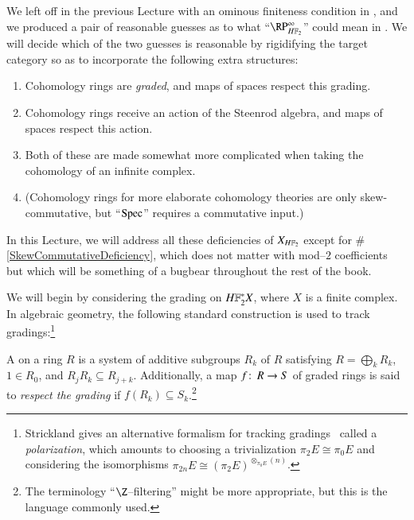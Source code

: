 We left off in the previous Lecture with an ominous finiteness condition in , and we produced a pair of reasonable guesses as to what ``$\RP^\infty_{\HFtwo}$'' could mean in .  We will decide which of the two guesses is reasonable by rigidifying the target category so as to incorporate the following extra structures:
\begin{enumerate}
\item Cohomology rings are \emph{graded}, and maps of spaces respect this grading.
\item Cohomology rings receive an action of the Steenrod algebra, and maps of spaces respect this action.
\item Both of these are made somewhat more complicated when taking the cohomology of an infinite complex.
\item \label{SkewCommutativeDeficiency} (Cohomology rings for more elaborate cohomology theories are only skew-commutative, but ``$\operatorname{Spec}$'' requires a commutative input.)
\end{enumerate}
In this Lecture, we will address all these deficiencies of $X_{\HFtwo}$ except for \#\ref{SkewCommutativeDeficiency}, which does not matter with mod--$2$ coefficients but which will be something of a bugbear throughout the rest of the book.

We will begin by considering the grading on $\HFtwo^* X$, where $X$ is a finite complex.  In algebraic geometry, the following standard construction is used to track gradings:\footnote{Strickland gives an alternative formalism for tracking gradings~\cite[Sections 11 and 14]{StricklandFPFP} called a \emph{polarization}, which amounts to choosing a trivialization $\pi_2 E \cong \pi_0 E$ and considering the isomorphisms $\pi_{2n} E \cong (\pi_2 E)^{\otimes_{\pi_0 E} (n)}$.}

\begin{definition}
A  on a ring $R$ is a system of additive subgroups $R_k$ of $R$ satisfying $R = \bigoplus_k R_k$, $1 \in R_0$, and $R_j R_k \subseteq R_{j+k}$.  Additionally, a map $f\colon\thinspace R \to S$ of graded rings is said to \textit{respect the grading} if $f(R_k) \subseteq S_k$.\footnote{The terminology ``$\Z$--filtering'' might be more appropriate, but this is the language commonly used.}
\end{definition}

